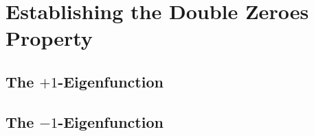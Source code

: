 \section{Establishing the Double Zeroes Property}

\subsection{The $+1$-Eigenfunction}

\subsection{The $-1$-Eigenfunction}